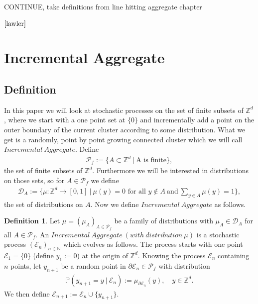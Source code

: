 \documentclass[12pt,a4paper]{scrartcl}
\numberwithin{equation}{subsection}
\newcommand{\1}{\mathbbm{1}}
\numberwithin{equation}{section}
\theoremstyle{definition}
\newtheorem{definition}{Definition}[subsection]
\begin{document}
CONTINUE, take definitions from line hitting aggregate chapter



\newpage
$\cite{lawler}$
\section{Incremental Aggregate}

\subsection{Definition}

In this paper we will look at stochastic processes on the set of finite subsets of $\mathbb{Z}^d$, where we start with a one point set at $\{0\}$ and incrementally add a point on the outer boundary of the current cluster according to some distribution. What we get is a randomly, point by point growing connected cluster which we will call $\mathit{Incremental\ Aggregate}$. Define 
\begin{align}
	\mathcal{P}_f := \{A\subset \mathbb{Z}^d\ |\ \text{A is finite}\}, 
\end{align}
the set of finite subsets of $\mathbb{Z}^d$. Furthermore we will be interested in distributions on those sets, so for $A\in \mathcal{P}_f$ we define 
\begin{align}
	\mathcal{D}_A:= \{\mu: \mathbb{Z}^d\to [0,1]\ |\ \mu(y) = 0 \text{ for all } y\notin A\ \text{and}\ \sum_{y\in A} \mu(y) = 1 \}, 
\end{align}
the set of distributions on $A$. Now we define $\mathit{Incremental\ Aggregate}$ as follows.  

\begin{definition} \label{incrementalaggregate}
	Let $\mu=(\mu_A)_{A\in \mathcal{P}_f}$ be a family of distributions with $\mu_A\in \mathcal{D}_A$ for all $A\in \mathcal{P}_f$. An $\mathit{Incremental\ Aggregate\ (with\ distribution\ \mu)}$ is a stochastic process $(\mathcal{E}_n)_{n\in{\mathbb{N}}}$ which evolves as follows. The process starts with one point $\mathcal{E}_1 = \{0\}$ (define $y_1 :=0$) at the origin of $\mathbb{Z}^d$. Knowing the process $\mathcal{E}_n$ containing $n$ points, let $y_{n+1}$ be a random point in $\partial \mathcal{E}_n\in \mathcal{P}_f$ with distribution
	\begin{align}
		\mathbb{P}(y_{n+1} = y\ |\ \mathcal{E}_n) := \mu_{\partial \mathcal{E}_n}(y),\quad y\in \mathbb{Z}^d.
	\end{align}
	We then define $\mathcal{E}_{n+1} := \mathcal{E}_n \cup \{y_{n+1}\}$.
\end{definition} 
\end{document}
